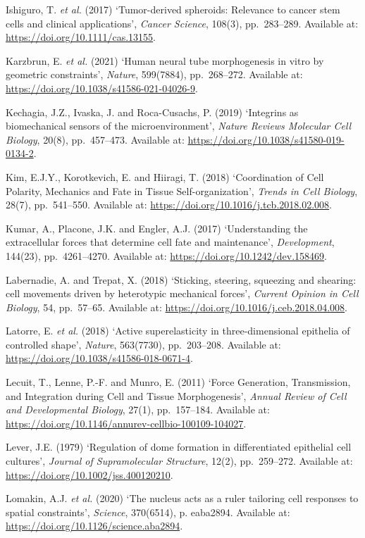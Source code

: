 \documentclass[
]{article}
\begin{document}
Ishiguro, T. \emph{et al.} (2017) `Tumor-derived spheroids: Relevance to
cancer stem cells and clinical applications', \emph{Cancer Science},
108(3), pp.~283--289. Available at:
\url{https://doi.org/10.1111/cas.13155}.

Karzbrun, E. \emph{et al.} (2021) `Human neural tube morphogenesis in
vitro by geometric constraints', \emph{Nature}, 599(7884), pp.~268--272.
Available at: \url{https://doi.org/10.1038/s41586-021-04026-9}.

Kechagia, J.Z., Ivaska, J. and Roca-Cusachs, P. (2019) `Integrins as
biomechanical sensors of the microenvironment', \emph{Nature Reviews
Molecular Cell Biology}, 20(8), pp.~457--473. Available at:
\url{https://doi.org/10.1038/s41580-019-0134-2}.

Kim, E.J.Y., Korotkevich, E. and Hiiragi, T. (2018) `Coordination of
Cell Polarity, Mechanics and Fate in Tissue Self-organization',
\emph{Trends in Cell Biology}, 28(7), pp.~541--550. Available at:
\url{https://doi.org/10.1016/j.tcb.2018.02.008}.

Kumar, A., Placone, J.K. and Engler, A.J. (2017) `Understanding the
extracellular forces that determine cell fate and maintenance',
\emph{Development}, 144(23), pp.~4261--4270. Available at:
\url{https://doi.org/10.1242/dev.158469}.

Labernadie, A. and Trepat, X. (2018) `Sticking, steering, squeezing and
shearing: cell movements driven by heterotypic mechanical forces',
\emph{Current Opinion in Cell Biology}, 54, pp.~57--65. Available at:
\url{https://doi.org/10.1016/j.ceb.2018.04.008}.

Latorre, E. \emph{et al.} (2018) `Active superelasticity in
three-dimensional epithelia of controlled shape', \emph{Nature},
563(7730), pp.~203--208. Available at:
\url{https://doi.org/10.1038/s41586-018-0671-4}.

Lecuit, T., Lenne, P.-F. and Munro, E. (2011) `Force Generation,
Transmission, and Integration during Cell and Tissue Morphogenesis',
\emph{Annual Review of Cell and Developmental Biology}, 27(1),
pp.~157--184. Available at:
\url{https://doi.org/10.1146/annurev-cellbio-100109-104027}.

Lever, J.E. (1979) `Regulation of dome formation in differentiated
epithelial cell cultures', \emph{Journal of Supramolecular Structure},
12(2), pp.~259--272. Available at:
\url{https://doi.org/10.1002/jss.400120210}.

Lomakin, A.J. \emph{et al.} (2020) `The nucleus acts as a ruler
tailoring cell responses to spatial constraints', \emph{Science},
370(6514), p. eaba2894. Available at:
\url{https://doi.org/10.1126/science.aba2894}.
\end{document}
